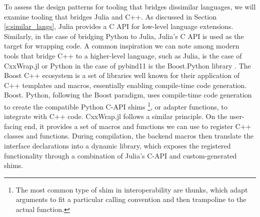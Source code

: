 To assess the design patterns for tooling that bridges dissimilar languages, we will examine tooling that bridges Julia and C++. As discussed in Section \ref{s:similar_langs}, Julia provides a C API for low-level language extensions. Similarly, in the case of bridging Python to Julia, Julia's C API is used as the target for wrapping code. A common inspiration we can note among modern tools that bridge C++ to a higher-level language, such as Julia, is the case of CxxWrap.jl \cite{libcxxwrap-julia} or Python in the case of pybind11 \cite{Jakob2024pybind} is the Boost.Python library \cite{boost_python_1_72}. The Boost C++ ecosystem is a set of libraries well known for their application of C++ templates and macros, essentially enabling compile-time code generation. Boost. Python, following the Boost paradigm, uses compile-time code generation to create the compatible Python C-API shims \footnote{The most common type of shim in interoperability are thunks, which adapt arguments to fit a particular calling convention and then trampoline to the actual function.}, or adapter functions, to integrate with C++ code. CxxWrap.jl follows a similar principle. On the user-facing end, it provides a set of macros and functions we can use to register C++ classes and functions. During compilation, the backend macros then translate the interface declarations into a dynamic library, which exposes the registered functionality through a combination of Julia's C-API and custom-generated shims. 

